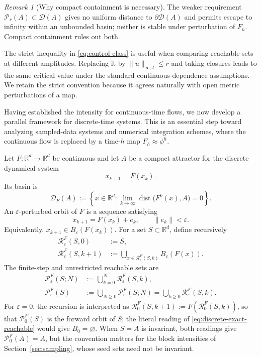 \documentclass[pdflatex,sn-mathphys-num]{sn-jnl}
\numberwithin{equation}{section}
\theoremstyle{thmstyleone}%
\theoremstyle{definition}
\theoremstyle{remark}
\newtheorem{remark}[theorem]{Remark}
\begin{document}
\begin{remark}[Why compact containment is necessary]
\label{rem:compact-containment}
The weaker requirement $\mathcal P_r(A)\subset\mathcal D(A)$ gives no uniform distance to $\partial\mathcal D(A)$ and permits escape to infinity within an unbounded basin; neither is stable under perturbation of $F_h$. Compact containment rules out both.
\end{remark}

The strict inequality in \eqref{eq:control-class} is useful when comparing reachable sets at different amplitudes. Replacing it by $\|u\|_{\infty,I}\leq r$ and taking closures leads to the same critical value under the standard continuous-dependence assumptions. We retain the strict convention because it agrees naturally with open metric perturbations of a map.

Having established the intensity for continuous-time flows, we now develop a parallel framework for discrete-time systems. This is an essential step toward analyzing sampled-data systems and numerical integration schemes, where the continuous flow is replaced by a time-$h$ map $F_h \approx \phi^h$.

Let $F:\mathbb R^d\to\mathbb R^d$ be continuous and let $A$ be a compact attractor for the discrete dynamical system
\begin{equation}
\label{eq:discrete-system}
    x_{k+1}=F(x_k).
\end{equation}
Its basin is
\[
    \mathcal D_F(A)
    :=
    \left\{
    x\in\mathbb R^d:
    \lim_{k\to\infty}
    \operatorname{dist}\bigl(F^k(x),A\bigr)=0
    \right\}.
\]
An $\varepsilon$-perturbed orbit of $F$ is a sequence satisfying
\begin{equation}
\label{eq:perturbed-map}
    x_{k+1}=F(x_k)+e_k,
    \qquad
    \|e_k\|<\varepsilon.
\end{equation}
Equivalently, $x_{k+1}\in B_\varepsilon(F(x_k))$. For a set $S\subset\mathbb R^d$, define recursively
\begin{align}
\label{eq:discrete-exact-reachable}
    \mathcal R_\varepsilon^F(S,0)
    &:=
    S,\\
    \mathcal R_\varepsilon^F(S,k+1)
    &:=
    \bigcup_{x\in\mathcal R_\varepsilon^F(S,k)}
    B_\varepsilon(F(x)). \nonumber
\end{align}
The finite-step and unrestricted reachable sets are
\begin{align*}
    \mathcal P_\varepsilon^F(S;N)
    &:=
    \bigcup_{k=0}^N
    \mathcal R_\varepsilon^F(S,k),\\
    \mathcal P_\varepsilon^F(S)
    &:=
    \bigcup_{N\geq0}
    \mathcal P_\varepsilon^F(S;N)
     =
    \bigcup_{k\geq0}
    \mathcal R_\varepsilon^F(S,k).
\end{align*}
For $\varepsilon=0$, the recursion is interpreted as $\mathcal R_0^F(S,k+1):=F(\mathcal R_0^F(S,k))$, so that $\mathcal P_0^F(S)$ is the forward orbit of $S$; the literal reading of \eqref{eq:discrete-exact-reachable} would give $B_0=\varnothing$. When $S=A$ is invariant, both readings give $\mathcal P_0^F(A)=A$, but the convention matters for the block intensities of Section~\ref{sec:sampling}, whose seed sets need not be invariant.
\end{document}
